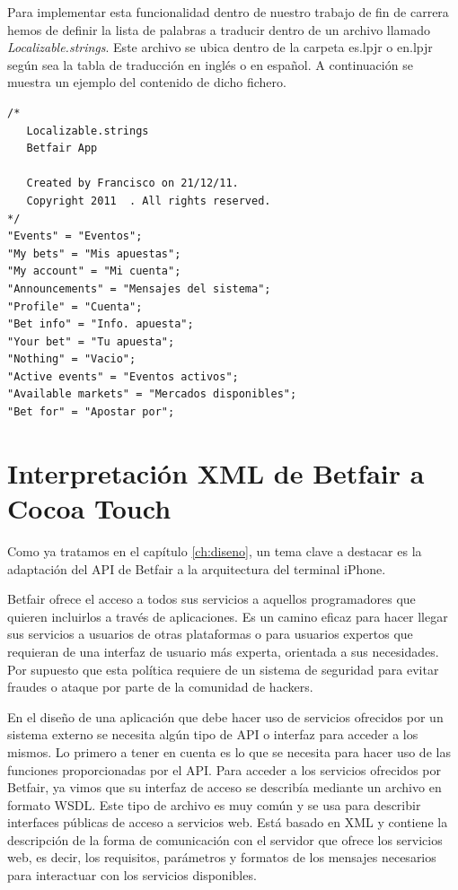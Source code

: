   
  
  Para implementar esta funcionalidad dentro de nuestro trabajo de fin de carrera hemos de definir la lista de palabras a traducir dentro de un archivo llamado \emph{Localizable.strings}. Este archivo se ubica dentro de la carpeta es.lpjr o en.lpjr según sea la tabla de traducción en inglés o en español. A continuación se muestra un ejemplo del contenido de dicho fichero.
  
\begin{lstlisting}[frame=single, language=xml,basicstyle=\small, keywordstyle = \color{blue}]
/* 
   Localizable.strings
   Betfair App

   Created by Francisco on 21/12/11.
   Copyright 2011  . All rights reserved.
*/
"Events" = "Eventos";
"My bets" = "Mis apuestas";
"My account" = "Mi cuenta";
"Announcements" = "Mensajes del sistema";
"Profile" = "Cuenta";
"Bet info" = "Info. apuesta";
"Your bet" = "Tu apuesta";
"Nothing" = "Vacio";
"Active events" = "Eventos activos";
"Available markets" = "Mercados disponibles";
"Bet for" = "Apostar por";  
\end{lstlisting}

   
\section{Interpretación XML de Betfair a Cocoa Touch}
 Como ya tratamos en el capítulo \ref{ch:diseno}, un tema clave a destacar es la adaptación del API de Betfair a la arquitectura del terminal iPhone. 
 
  Betfair ofrece el acceso a todos sus servicios a aquellos programadores que quieren incluirlos a través de aplicaciones. Es un camino eficaz para hacer llegar sus servicios a usuarios de otras plataformas o para usuarios expertos que requieran de una interfaz de usuario más experta, orientada a sus necesidades. Por supuesto que esta política requiere de un sistema de seguridad para evitar fraudes o ataque por parte de la comunidad de hackers.
   
  En el diseño de una aplicación que debe hacer uso de servicios ofrecidos por un sistema externo se necesita algún tipo de API o interfaz para acceder a los mismos. Lo primero a tener en cuenta es lo que se necesita para hacer uso de las funciones proporcionadas por el API. Para acceder a los servicios ofrecidos por Betfair, ya vimos que su interfaz de acceso se describía mediante un archivo en formato WSDL. Este tipo de archivo es muy común y se usa para describir interfaces públicas de acceso a servicios web. Está basado en XML y contiene la descripción de la forma de comunicación con el servidor que ofrece los servicios web, es decir, los requisitos, parámetros y formatos de los mensajes necesarios para interactuar con los servicios disponibles. 
   
